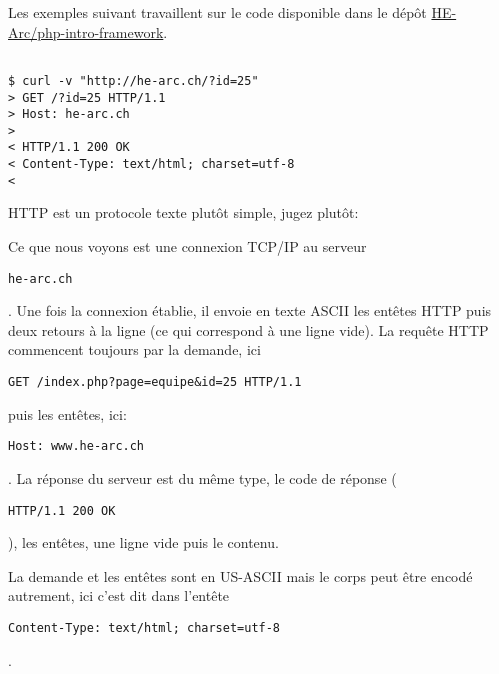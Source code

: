 Les exemples suivant travaillent sur le code disponible dans le dépôt
\href{https://github.com/HE-Arc/php-intro-framework}{HE-Arc/php-intro-framework}.

\begin{otherlanguage}{english}

\begin{verbatim}

$ curl -v "http://he-arc.ch/?id=25"
> GET /?id=25 HTTP/1.1
> Host: he-arc.ch
>
< HTTP/1.1 200 OK
< Content-Type: text/html; charset=utf-8
<
\end{verbatim}

\end{otherlanguage}

\begin{otherlanguage}{english}

\begin{Shaded}
\begin{Highlighting}[]
\DataTypeTok{>}
\end{Highlighting}
\end{Shaded}

\end{otherlanguage}

HTTP est un protocole texte plutôt simple, jugez plutôt:

Ce que nous voyons est une connexion TCP/IP au serveur
\begin{otherlanguage}{english}\texttt{he-arc.ch}\end{otherlanguage}. Une
fois la connexion établie, il envoie en texte ASCII les entêtes HTTP
puis deux retours à la ligne (ce qui correspond à une ligne vide). La
requête HTTP commencent toujours par la demande, ici
\begin{otherlanguage}{english}\texttt{GET\ /index.php?page=equipe\&id=25\ HTTP/1.1}\end{otherlanguage}
puis les entêtes, ici:
\begin{otherlanguage}{english}\texttt{Host:\ www.he-arc.ch}\end{otherlanguage}.
La réponse du serveur est du même type, le code de réponse
(\begin{otherlanguage}{english}\texttt{HTTP/1.1\ 200\ OK}\end{otherlanguage}),
les entêtes, une ligne vide puis le contenu.

La demande et les entêtes sont en US-ASCII mais le corps peut être
encodé autrement, ici c'est dit dans l'entête
\begin{otherlanguage}{english}\texttt{Content-Type:\ text/html;\ charset=utf-8}\end{otherlanguage}.

